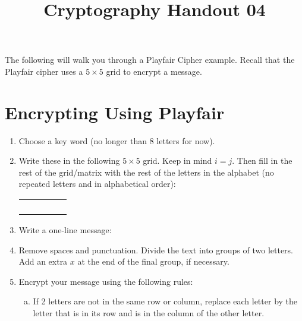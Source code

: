 \documentclass[12pt]{amsart}
\makeatletter
\def\subtitle#1{\gdef\@subtitle{#1}}
\def\@subtitle{}
\theoremstyle{plain}
\theoremstyle{definition}
\theoremstyle{remark}
\makeatother
\begin{document}
\onehalfspacing

\title[]{Cryptography Handout 04}
\subtitle{Playfair Cipher}
\maketitle

The following will walk you through a Playfair Cipher example.  Recall that the Playfair cipher uses a $5\times 5$ grid to encrypt a message.

\section{Encrypting Using Playfair}
\begin{enumerate}[1.]
	\item Choose a key word (no longer than 8 letters for now).\\ \vspace{.5in}
	\item Write these in the following $5 \times 5$ grid.  Keep in mind $i = j$.  Then fill in the rest of the grid/matrix with the rest of the letters in the alphabet (no repeated letters and in alphabetical order):\\
	\begin{center}
		\begin{tabular}{|p{.5in}|p{.5in}|p{.5in}|p{.5in}|p{.5in}|} \hline
		&&&&\\\hline
		&&&&\\\hline
		&&&&\\\hline
		&&&&\\\hline
		&&&&\\ \hline
		\end{tabular}
	\end{center}
	\item Write a one-line message:\\ \vspace{.5in}
	\item Remove spaces and punctuation.  Divide the text into groups of two letters.  Add an extra $x$ at the end of the final group, if necessary.\\ \vspace{1in}
	\newpage \item Encrypt your message using the following rules:
		\begin{enumerate}[a.]
			\item If 2 letters are not in the same row or column, replace each letter by the letter that is in its row and is in the column of the other letter.\\

\end{enumerate}
\end{enumerate}
\end{document}
